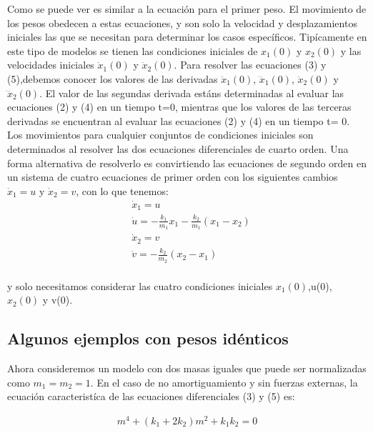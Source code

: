 \documentclass{article}
\begin{document}
Como se puede ver es similar a la ecuación para el primer peso. El movimiento de los pesos obedecen a estas ecuaciones, y son solo la velocidad y desplazamientos iniciales las que se necesitan para determinar los casos específicos.
\newline
Tipícamente en este tipo de modelos se tienen las condiciones iniciales de $x_1(0)$ y $x_2(0)$ y las velocidades iniciales $\dot x_1(0)$ y $\dot x_2(0)$. Para resolver las ecuaciones (3) y (5),debemos conocer los valores de las derivadas $\ddot x_1(0)$, $\dddot x_1(0)$, $\ddot x_2(0)$ y $\dddot x_2(0)$. El valor de las segundas derivada estáns determinadas al evaluar las ecuaciones (2) y (4) en un tiempo t=0, mientras que los valores de las terceras derivadas se encuentran al evaluar las ecuaciones (2) y (4) en un tiempo t= 0.
\newline
Los movimientos para cualquier conjuntos de condiciones iniciales son determinados al resolver las dos ecuaciones diferenciales de cuarto orden.
\newline
Una forma alternativa de resolverlo es convirtiendo las ecuaciones de segundo orden en un sistema de cuatro ecuaciones de primer orden con los siguientes cambios $\dot x_1=u$ y $\dot x_2=v$, con lo que tenemos:
\begin{equation}
\begin{aligned}
&\dot x_1=u\\
&\dot u=-\frac{k_1}{m_1}x_1-\frac{k_2}{m_1}(x_1-x_2)\\
&\dot x_2=v\\
&\dot v= -\frac{k_2}{m_2}(x_2-x_1)\\
\end{aligned}
\end{equation}

y solo necesitamos considerar las cuatro condiciones iniciales $x_1(0)$,u(0), $x_2(0)$ y v(0).

\subsection{Algunos ejemplos con pesos idénticos}
Ahora consideremos un modelo con dos masas iguales que puede ser normalizadas como $m_1=m_2=1$. En el caso de no amortiguamiento y sin fuerzas externas, la ecuación caracteristíca de las ecuaciones diferenciales (3) y (5) es:

\begin{equation}
\begin{aligned}
m^4+(k_1+2k_2)m^2+k_1k_2=0
\end{aligned}
\end{equation}
\end{document}
